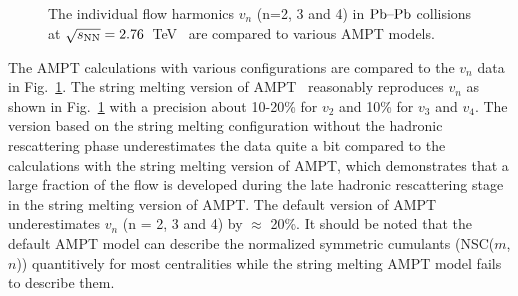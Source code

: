 \begin{figure}[h]
\begin{center}
        \caption{The individual flow harmonics $v_n$ (n=2, 3 and 4) in $\textnormal{Pb--Pb}$ collisions at $\sqrt{s_{\textnormal{NN}}}=2.76$~TeV~\cite{Adam:2016izf} are compared to various AMPT models.}
        \label{fig:Figure_10}
              \end{center}
\end{figure}

The AMPT calculations with various configurations are compared to the $v_n$ data in Fig.~\ref{fig:Figure_10}.
The string melting version of AMPT~\cite{Lin:2001zk,Lin:2004en} reasonably reproduces $v_n$ as shown in Fig.~\ref{fig:Figure_10} with a precision about 10-20\% for $v_2$ and 10\% for $v_3$ and $v_4$. The version based on the string melting configuration without the hadronic rescattering phase underestimates the data quite a bit compared to the calculations with the string melting version of AMPT, which demonstrates that a large fraction of the flow is developed during the late hadronic rescattering stage in the string melting version of AMPT.
The default version of AMPT underestimates $v_n$ (n = 2, 3 and 4) by $\approx$ 20\%. It should be noted that the default AMPT model can describe the normalized symmetric cumulants (NSC($m$,$n$)) quantitively for most centralities while the string melting AMPT model fails to describe them.

